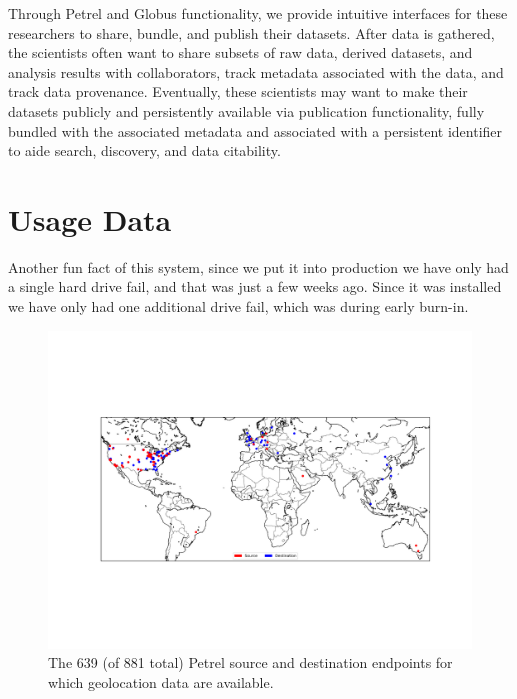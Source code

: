 \documentclass[sigconf]{acmart}
\begin{document}
Through Petrel and Globus functionality, we provide intuitive interfaces for these researchers to share, bundle, and publish their datasets. After data is gathered, the scientists often want to share subsets of raw data, derived datasets, and analysis results with collaborators, track metadata associated with the data, and track data provenance. Eventually, these scientists may want to make their datasets publicly and persistently available via publication functionality, fully bundled with the associated metadata and associated with a persistent identifier to aide search, discovery, and data citability.



\section{Usage Data}

Another fun fact of this system, since we put it into production we have only had a single hard drive fail, and that was just a few weeks ago. Since it was installed we have only had one additional drive fail, which was during early burn-in.

\begin{figure}
\centering
\includegraphics[trim=2in 3.3in 1.4in 3in,clip,width=\columnwidth]{Figures/petrel-src-dst-map2.png}

\vspace{-1ex}

\caption{The 639 (of 881 total) Petrel source and destination endpoints for which geolocation
data are available.\label{fig:usage1}}
\end{figure}
\end{document}
